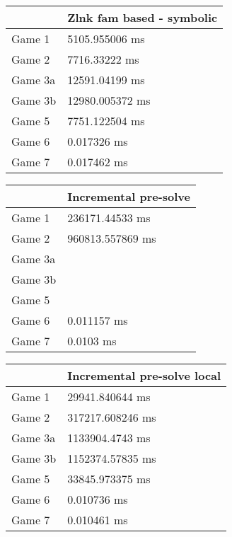 \begin{tabular}{|l|l|}
	\hline
	& Zlnk fam based - symbolic \\ \hline
	Game 1 & 5105.955006 ms \\ \hline
	Game 2 & 7716.33222 ms \\ \hline
	Game 3a & 12591.04199 ms \\ \hline
	Game 3b & 12980.005372 ms \\ \hline
	Game 5 & 7751.122504 ms \\ \hline
	Game 6 & 0.017326 ms \\ \hline
	Game 7 & 0.017462 ms \\ \hline
\end{tabular}
\begin{tabular}{|l|l|}
	\hline
	& Incremental pre-solve \\ \hline
	Game 1 & 236171.44533 ms \\ \hline
	Game 2 & 960813.557869 ms \\ \hline
	Game 3a & \dag \\ \hline
	Game 3b & \dag \\ \hline
	Game 5 & \dag \\ \hline
	Game 6 & 0.011157 ms \\ \hline
	Game 7 & 0.0103 ms \\ \hline
\end{tabular}
\begin{tabular}{|l|l|}
	\hline
	& Incremental pre-solve local \\ \hline
	Game 1 & 29941.840644 ms \\ \hline
	Game 2 & 317217.608246 ms \\ \hline
	Game 3a & 1133904.4743 ms \\ \hline
	Game 3b & 1152374.57835 ms \\ \hline
	Game 5 & 33845.973375 ms \\ \hline
	Game 6 & 0.010736 ms \\ \hline
	Game 7 & 0.010461 ms \\ \hline
\end{tabular}
